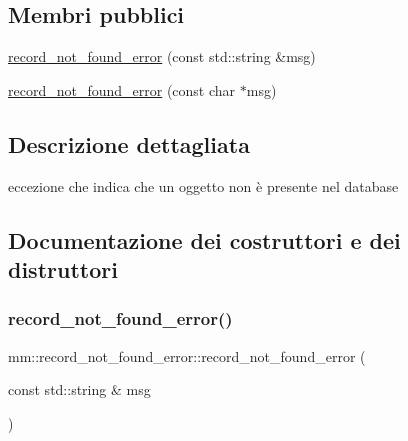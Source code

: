 \subsection*{Membri pubblici}
\begin{DoxyCompactItemize}
\item 
\mbox{\hyperlink{classmm_1_1record__not__found__error_a3457a336328538174f06d4023b7474c8}{record\+\_\+not\+\_\+found\+\_\+error}} (const std\+::string \&msg)
\item 
\mbox{\hyperlink{classmm_1_1record__not__found__error_aa8bc0fb2788b4442295f85103fa94e2b}{record\+\_\+not\+\_\+found\+\_\+error}} (const char $\ast$msg)
\end{DoxyCompactItemize}


\subsection{Descrizione dettagliata}
eccezione che indica che un oggetto non è presente nel database 

\subsection{Documentazione dei costruttori e dei distruttori}
\mbox{\label{classmm_1_1record__not__found__error_a3457a336328538174f06d4023b7474c8}} 
\subsubsection{\texorpdfstring{record\+\_\+not\+\_\+found\+\_\+error()}{record\_not\_found\_error()}\hspace{0.1cm}{\footnotesize\ttfamily [1/2]}}
{\footnotesize\ttfamily mm\+::record\+\_\+not\+\_\+found\+\_\+error\+::record\+\_\+not\+\_\+found\+\_\+error (\begin{DoxyParamCaption}\item[{const std\+::string \&}]{msg }\end{DoxyParamCaption})\hspace{0.3cm}{\ttfamily [explicit]}}

\mbox{\label{classmm_1_1record__not__found__error_aa8bc0fb2788b4442295f85103fa94e2b}} 
